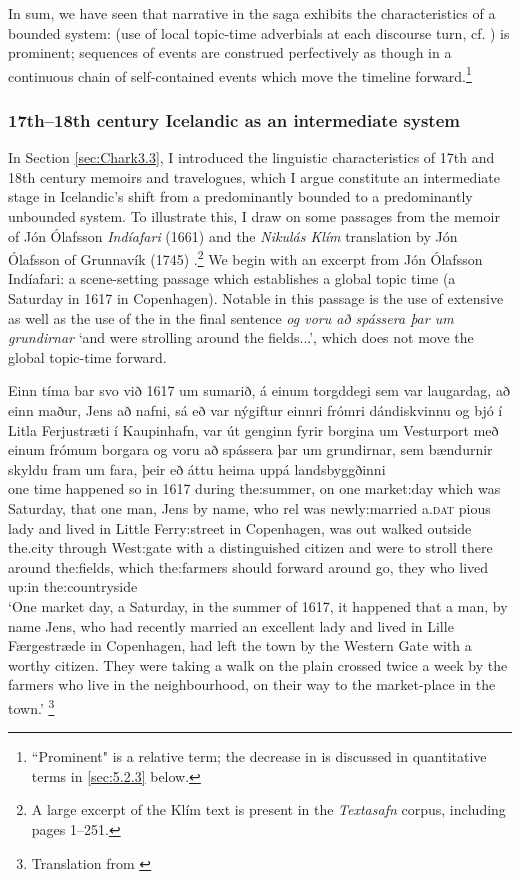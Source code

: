 \documentclass[output=paper,colorlinks,citecolor=brown]{langscibook}
\begin{document}
In sum, we have seen that narrative in the saga  exhibits the characteristics of a bounded system:   (use of local topic-time adverbials at each discourse turn, cf. \citealt{los2012}) is prominent; sequences of events are construed perfectively as though in a continuous chain of self-contained events which move the timeline forward.\footnote{``Prominent" is a relative term; the decrease in   is discussed in quantitative terms in \ref{sec:5.2.3} below.}

\subsubsection{17th--18th century Icelandic as an intermediate system}\label{sec:Chark4.2.2}

In Section \ref{sec:Chark3.3}, I introduced the linguistic characteristics of 17th and 18th century memoirs and travelogues, which I argue constitute an intermediate stage in Icelandic's shift from a predominantly bounded to a predominantly unbounded system. To illustrate this, I draw on some passages from the memoir of Jón Ólafsson \textit{Indíafari} (1661) \citep{olafsson1908aefisaga} and the \textit{Nikulás Klím} translation by Jón Ólafsson of Grunnavík (1745) \citep{holberg1948nikulas}.\footnote{A large excerpt of the Klím text is present in the \textit{Textasafn} corpus, including pages 1--251.} We begin with an excerpt from Jón Ólafsson Indíafari: a scene-setting passage which establishes a global topic time (a Saturday in 1617 in Copenhagen). Notable in this passage is the use of extensive  as well as the use of the   in the final sentence \textit{og voru að spássera þar um grundirnar} `and were strolling around the fields...', which does not move the global topic-time forward.

\ea 
\gll Einn tíma bar svo við 1617 um sumarið, á einum torgddegi sem var laugardag, að einn maður, Jens að nafni, sá eð var nýgiftur einnri frómri dándiskvinnu og bjó í Litla Ferjustræti í Kaupinhafn, var út genginn fyrir borgina um Vesturport með einum frómum borgara og voru að spássera þar um grundirnar, sem bændurnir skyldu fram um fara, þeir eð áttu heima uppá landsbyggðinni\\
one time happened so in 1617 during the:summer, on one market:day which was Saturday, that one man, Jens by name, who rel was newly:married a.\textsc{dat} pious lady and lived in Little Ferry:street in Copenhagen, was out walked outside the.city through West:gate with a distinguished citizen and were to stroll there around the:fields, which the:farmers should forward around go, they who lived {} up:in the:countryside\\
\glt `One market day, a Saturday, in the summer of 1617, it happened that a man, by name Jens, who had recently married an excellent lady and lived in Lille Færgestræde in Copenhagen, had left the town by the Western Gate with a worthy citizen. They were taking a walk on the plain crossed twice a week by the farmers who live in the neighbourhood, on their way to the market-place in the town.' \hfill \citep[38]{olafsson1908aefisaga}\footnote{Translation from \citet[95]{phillpotts2017life}}
\z
\end{document}
